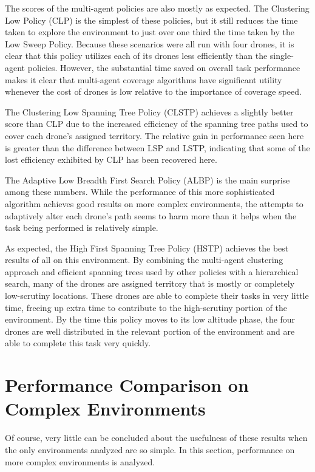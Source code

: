 The scores of the multi-agent policies are also mostly as expected. The Clustering Low Policy (CLP) is the simplest of these policies, but it still reduces the time taken to explore the environment to just over one third the time taken by the Low Sweep Policy. Because these scenarios were all run with four drones, it is clear that this policy utilizes each of its drones less efficiently than the single-agent policies. However, the substantial time saved on overall task performance makes it clear that multi-agent coverage algorithms have significant utility whenever the cost of drones is low relative to the importance of coverage speed.

The Clustering Low Spanning Tree Policy (CLSTP) achieves a slightly better score than CLP due to the increased efficiency of the spanning tree paths used to cover each drone's assigned territory. The relative gain in performance seen here is greater than the difference between LSP and LSTP, indicating that some of the lost efficiency exhibited by CLP has been recovered here. 

The Adaptive Low Breadth First Search Policy (ALBP) is the main surprise among these numbers. While the performance of this more sophisticated algorithm achieves good results on more complex environments, the attempts to adaptively alter each drone's path seems to harm more than it helps when the task being performed is relatively simple.

As expected, the High First Spanning Tree Policy (HSTP) achieves the best results of all on this environment. By combining the multi-agent clustering approach and efficient spanning trees used by other policies with a hierarchical search, many of the drones are assigned territory that is mostly or completely low-scrutiny locations. These drones are able to complete their tasks in very little time, freeing up extra time to contribute to the high-scrutiny portion of the environment. By the time this policy moves to its low altitude phase, the four drones are well distributed in the relevant portion of the environment and are able to complete this task very quickly.

\section{Performance Comparison on Complex Environments}

Of course, very little can be concluded about the usefulness of these results when the only environments analyzed are so simple. In this section, performance on more complex environments is analyzed.

